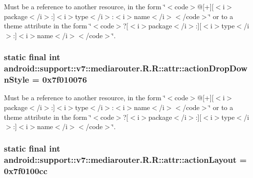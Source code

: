 Must be a reference to another resource, in the form \char`\"{}$<$code$>$@\mbox{[}+\mbox{]}\mbox{[}$<$i$>$package$<$/i$>$:\mbox{]}$<$i$>$type$<$/i$>$:$<$i$>$name$<$/i$>$$<$/code$>$\char`\"{} or to a theme attribute in the form \char`\"{}$<$code$>$?\mbox{[}$<$i$>$package$<$/i$>$:\mbox{]}\mbox{[}$<$i$>$type$<$/i$>$:\mbox{]}$<$i$>$name$<$/i$>$$<$/code$>$\char`\"{}. \hypertarget{classandroid_1_1support_1_1v7_1_1mediarouter_1_1_r_1_1attr_c4359437a4ae1cacfbf4099d0ac9e87a}{
\subsubsection[{actionDropDownStyle}]{\setlength{\rightskip}{0pt plus 5cm}static final int android::support::v7::mediarouter.R.R::attr::actionDropDownStyle = 0x7f010076}}
\label{classandroid_1_1support_1_1v7_1_1mediarouter_1_1_r_1_1attr_c4359437a4ae1cacfbf4099d0ac9e87a}


Must be a reference to another resource, in the form \char`\"{}$<$code$>$@\mbox{[}+\mbox{]}\mbox{[}$<$i$>$package$<$/i$>$:\mbox{]}$<$i$>$type$<$/i$>$:$<$i$>$name$<$/i$>$$<$/code$>$\char`\"{} or to a theme attribute in the form \char`\"{}$<$code$>$?\mbox{[}$<$i$>$package$<$/i$>$:\mbox{]}\mbox{[}$<$i$>$type$<$/i$>$:\mbox{]}$<$i$>$name$<$/i$>$$<$/code$>$\char`\"{}. \hypertarget{classandroid_1_1support_1_1v7_1_1mediarouter_1_1_r_1_1attr_bd565495a6dd407b0335355a1774c430}{
\subsubsection[{actionLayout}]{\setlength{\rightskip}{0pt plus 5cm}static final int android::support::v7::mediarouter.R.R::attr::actionLayout = 0x7f0100cc}}
\label{classandroid_1_1support_1_1v7_1_1mediarouter_1_1_r_1_1attr_bd565495a6dd407b0335355a1774c430}


